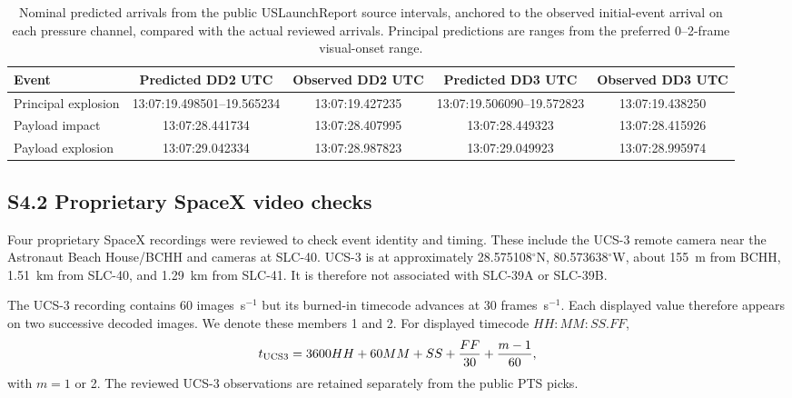 \documentclass[]{seismica}
\begin{document}
\begin{table}[!tbp]
\centering
\caption{Nominal predicted arrivals from the public USLaunchReport source
intervals, anchored to the observed initial-event arrival on each pressure
channel, compared with the actual reviewed arrivals. Principal predictions are
ranges from the preferred 0--2-frame visual-onset range.}
\label{tab:supp_predicted_arrivals}
\begin{tabularx}{\textwidth}{Xcccc}
\hline
Event & Predicted DD2 UTC & Observed DD2 UTC & Predicted DD3 UTC & Observed DD3 UTC \\
\hline
Principal explosion & 13:07:19.498501--19.565234 & 13:07:19.427235 & 13:07:19.506090--19.572823 & 13:07:19.438250 \\
Payload impact & 13:07:28.441734 & 13:07:28.407995 & 13:07:28.449323 & 13:07:28.415926 \\
Payload explosion & 13:07:29.042334 & 13:07:28.987823 & 13:07:29.049923 & 13:07:28.995974 \\
\hline
\end{tabularx}
\end{table}

\subsection*{S4.2 Proprietary SpaceX video checks}

Four proprietary SpaceX recordings were reviewed to check event identity and
timing. These include the UCS-3 remote camera near the Astronaut Beach
House/BCHH and cameras at SLC-40. UCS-3 is at approximately
28.575108$^\circ$N, 80.573638$^\circ$W, about 155~m from BCHH, 1.51~km from
SLC-40, and 1.29~km from SLC-41. It is therefore not associated with
SLC-39A or SLC-39B.

The UCS-3 recording contains 60 images~s$^{-1}$ but its burned-in timecode
advances at 30 frames~s$^{-1}$. Each displayed value therefore appears on two
successive decoded images. We denote these members 1 and 2. For displayed
timecode $HH{:}MM{:}SS.FF$,
\begin{equation}
 t_{\rm UCS3}=3600HH+60MM+SS+\frac{FF}{30}+\frac{m-1}{60},
\end{equation}
with $m=1$ or 2. The reviewed UCS-3 observations are retained separately from
the public PTS picks.
\end{document}
